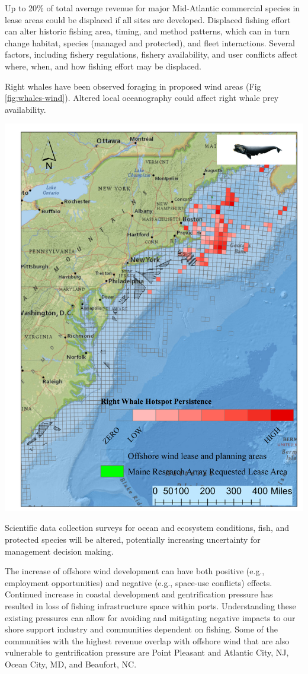 \documentclass[
  10pt,
]{article}
\let\origfigure\figure
\let\endorigfigure\endfigure
\renewenvironment{figure}[1][2] {
    \expandafter\origfigure\expandafter[H]
} {
    \endorigfigure
}
\begin{document}
Up to 20\% of total average revenue for major Mid-Atlantic commercial
species in lease areas could be displaced if all sites are developed.
Displaced fishing effort can alter historic fishing area, timing, and
method patterns, which can in turn change habitat, species (managed and
protected), and fleet interactions. Several factors, including fishery
regulations, fishery availability, and user conflicts affect where,
when, and how fishing effort may be displaced.

Right whales have been observed foraging in proposed wind areas (Fig
\ref{fig:whales-wind}). Altered local oceanography could affect right
whale prey availability.

\begin{figure}

{\centering \includegraphics[width=0.6\linewidth]{images/NARW_hotpsot_persistence_2_1_2022_TPW} 

}

\caption{Northern Right Whale persistent hotspots and Wind Energy Areas.}\label{fig:whales-wind}
\end{figure}

Scientific data collection surveys for ocean and ecosystem conditions,
fish, and protected species will be altered, potentially increasing
uncertainty for management decision making.

The increase of offshore wind development can have both positive (e.g.,
employment opportunities) and negative (e.g., space-use conflicts)
effects. Continued increase in coastal development and gentrification
pressure has resulted in loss of fishing infrastructure space within
ports. Understanding these existing pressures can allow for avoiding and
mitigating negative impacts to our shore support industry and
communities dependent on fishing. Some of the communities with the
highest revenue overlap with offshore wind that are also vulnerable to
gentrification pressure are Point Pleasant and Atlantic City, NJ, Ocean
City, MD, and Beaufort, NC.
\end{document}
